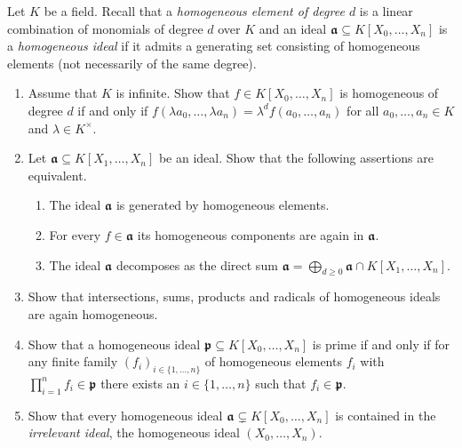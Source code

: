 \documentclass{exercises}
\begin{document}
\begin{exercise}
  Let $K$ be a field.
  Recall that a \emph{homogeneous element of degree $d$} is a linear combination of monomials of degree $d$ over $K$ and an ideal $𝖆⊆K[X_0,\dots,X_n]$ is a \emph{homogeneous ideal} if it admits a generating set consisting of homogeneous elements (not necessarily of the same degree).
  \begin{enumerate}
    \item Assume that $K$ is infinite.
      Show that $f ∈ K[X_0,\dots,X_n]$ is homogeneous of degree $d$ if and only if $f(λa_0,\dots,λa_n) = λ^d f(a_0,\dots,a_n)$ for all $a_0,\dots,a_n ∈ K$ and $λ ∈ K^×$.
    \item Let $𝖆⊆K[X_1,\dots,X_n]$ be an ideal.
      Show that the following assertions are equivalent.
      \begin{enumerate}
        \item The ideal $𝖆$ is generated by homogeneous elements.
        \item For every $f∈𝖆$ its homogeneous components are again in $𝖆$.
        \item The ideal $𝖆$ decomposes as the direct sum $𝖆 = \bigoplus_{d≥0}𝖆 ∩ K[X_1,\dots,X_n]$.
      \end{enumerate}
    \item Show that intersections, sums, products and radicals of homogeneous ideals are again homogeneous.
    \item Show that a homogeneous ideal $𝖕⊆K[X_0,\dots,X_n]$ is prime if and only if for any finite family $(f_i)_{i∈\{1,\dots,n\}}$ of homogeneous elements $f_i$ with $∏_{i=1}^n f_i ∈ 𝖕$ there exists an $i ∈ \{1,\dots,n\}$ such that $f_i ∈ 𝖕$.
    \item Show that every homogeneous ideal $𝖆 ⊊ K[X_0,\dots,X_n]$ is contained in the \emph{irrelevant ideal}, the homogeneous ideal $(X_0,\dots,X_n)$.
  \end{enumerate}
\end{exercise}
\end{document}
